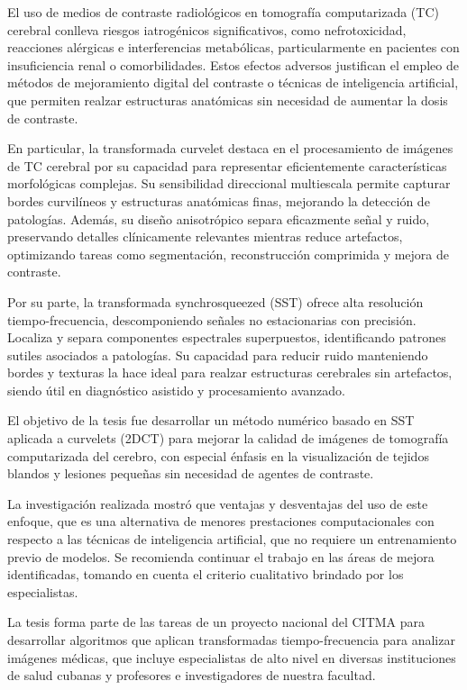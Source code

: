 \begin{opinion}
    El uso de medios de contraste radiológicos en tomografía computarizada (TC) cerebral conlleva riesgos iatrogénicos significativos, como nefrotoxicidad, reacciones alérgicas e interferencias metabólicas, particularmente en pacientes con insuficiencia renal o comorbilidades. Estos efectos adversos justifican el empleo de métodos de mejoramiento digital del contraste o técnicas de inteligencia artificial, que permiten realzar estructuras anatómicas sin necesidad de aumentar la dosis de contraste.

    En particular, la transformada curvelet destaca en el procesamiento de imágenes de TC cerebral por su capacidad para representar eficientemente características morfológicas complejas. Su sensibilidad direccional multiescala permite capturar bordes curvilíneos y estructuras anatómicas finas, mejorando la detección de patologías. Además, su diseño anisotrópico separa eficazmente señal y ruido, preservando detalles clínicamente relevantes mientras reduce artefactos, optimizando tareas como segmentación, reconstrucción comprimida y mejora de contraste.

    Por su parte, la transformada synchrosqueezed (SST) ofrece alta resolución tiempo-frecuencia, descomponiendo señales no estacionarias con precisión. Localiza y separa componentes espectrales superpuestos, identificando patrones sutiles asociados a patologías. Su capacidad para reducir ruido manteniendo bordes y texturas la hace ideal para realzar estructuras cerebrales sin artefactos, siendo útil en diagnóstico asistido y procesamiento avanzado.

    El objetivo de la tesis fue desarrollar un método numérico basado en SST aplicada a curvelets (2DCT) para mejorar la calidad de imágenes de tomografía computarizada del cerebro, con especial énfasis en la visualización de tejidos blandos y lesiones pequeñas sin necesidad de agentes de contraste.

    La investigación realizada mostró que ventajas y desventajas del uso de este enfoque, que es una alternativa de menores prestaciones computacionales con respecto a las técnicas de inteligencia artificial, que no requiere un entrenamiento previo de modelos. Se recomienda continuar el trabajo en las áreas de mejora identificadas, tomando en cuenta el criterio cualitativo brindado por los especialistas.

    La tesis forma parte de las tareas de un proyecto nacional del CITMA para desarrollar algoritmos que aplican transformadas tiempo-frecuencia para analizar imágenes médicas, que incluye especialistas de alto nivel en diversas instituciones de salud cubanas y profesores e investigadores de nuestra facultad.


\end{opinion}
